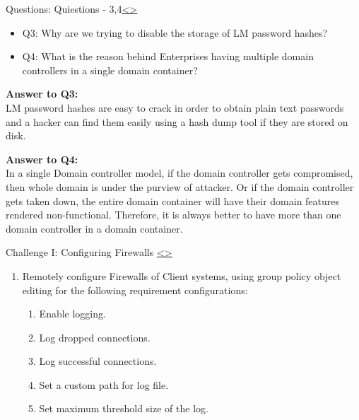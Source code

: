 \documentclass[12pt]{extarticle}
\newenvironment{instructionblock}{\Large\bgroup}{\egroup}
\newcommand{\bi}{\begin{itemize}}
\newcommand{\ei}{\end{itemize}}
\begin{document}
\pagebreak
\begin{slide}{Questions: Quiestions - 3,4}{\hyperref[slide 17]{\textless}\hyperref[slide 19]{\textgreater}}
\begin{instructionblock}
\bi 
\item[Q3:] Why are we trying to disable the storage of LM password hashes?
\item[Q4:] What is the reason behind Enterprises having multiple domain controllers in a single domain container?
\ei

\end{instructionblock}
\end{slide}
\vfill

\vspace{2mm}
\noindent
\textbf{Answer to Q3:}\\
LM password hashes are easy to crack in order to obtain plain text passwords and a hacker can find them easily using a hash dump tool if they are stored on disk.


\vspace{6mm}
\noindent
\textbf{Answer to Q4:}\\
In a single Domain controller model, if the domain controller gets compromised, then whole domain is under the purview of attacker. Or if the domain controller gets taken down, the entire domain container will have their domain features rendered non-functional.
Therefore, it is always better to have more than one domain controller in a domain container.


 

\pagebreak
\begin{slide}{Challenge I: Configuring Firewalls }{\hyperref[slide 18]{\textless}\hyperref[slide 20]{\textgreater}}
\begin{instructionblock}
\begin{enumerate}
\item Remotely configure Firewalls of Client systems, using group policy object editing for the following requirement configurations:
\begin{enumerate}
	\item {Enable logging.}
	\item {Log dropped connections.}
	\item {Log successful connections.}
	\item {Set a custom path for log file.}
	\item {Set maximum threshold size of the log.}
\end{enumerate}
\end{enumerate}

\end{instructionblock}
\end{slide}
\end{document}
